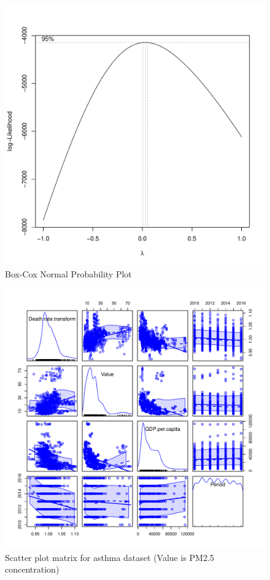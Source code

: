 \documentclass[12pt, letterpaper, twoside]{article}
\begin{document}
\begin{figure}[t]
\includegraphics[scale=0.6]{boxcox.pdf}
\centering
\caption{Box-Cox Normal Probability Plot}
\label{fig:Figure 1}
    \vspace{1cm}
\end{figure}
\begin{figure}[t]
\includegraphics[scale=0.5]{scatterplotmatrix.asthma.pdf}
\centering
\caption{Scatter plot matrix for asthma dataset (Value is PM2.5 concentration)}
\label{fig:Figure 2}
    \vspace{1cm}
\end{figure}
\end{document}
